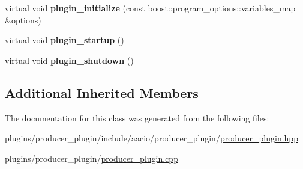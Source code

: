 \begin{DoxyCompactItemize}
virtual void {\bfseries plugin\+\_\+initialize} (const boost\+::program\+\_\+options\+::variables\+\_\+map \&options)
\item 
\mbox{\label{classaacio_1_1producer__plugin_aaeb8734f1f6f91d5b454c1930864150c}} 
virtual void {\bfseries plugin\+\_\+startup} ()
\item 
\mbox{\label{classaacio_1_1producer__plugin_acf14ab8d5a5c77372e7610aaed89feb1}} 
virtual void {\bfseries plugin\+\_\+shutdown} ()
\end{DoxyCompactItemize}
\subsection*{Additional Inherited Members}


The documentation for this class was generated from the following files\+:\begin{DoxyCompactItemize}
\item 
plugins/producer\+\_\+plugin/include/aacio/producer\+\_\+plugin/\mbox{\hyperlink{producer__plugin_8hpp}{producer\+\_\+plugin.\+hpp}}\item 
plugins/producer\+\_\+plugin/\mbox{\hyperlink{producer__plugin_8cpp}{producer\+\_\+plugin.\+cpp}}\end{DoxyCompactItemize}
